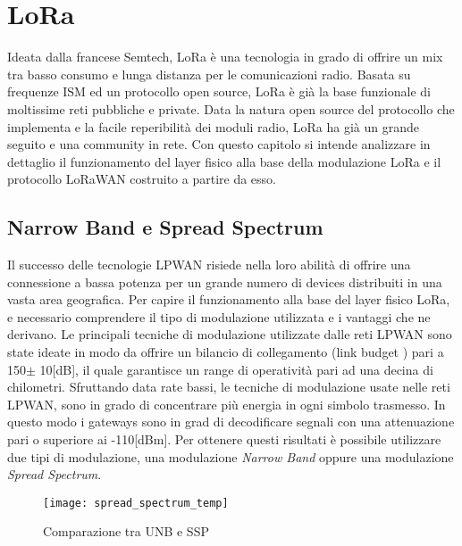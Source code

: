 \chapter{LoRa}
Ideata dalla francese Semtech, LoRa è una tecnologia in grado di offrire un mix
tra basso consumo e lunga distanza per le comunicazioni radio. Basata su
frequenze ISM ed un protocollo open source, LoRa è già la base funzionale di moltissime
reti pubbliche e private.
Data la natura open source del protocollo che implementa e la facile
reperibilità dei moduli radio, LoRa ha già un grande seguito e una community in
rete. Con questo capitolo si intende analizzare in dettaglio il funzionamento
del layer fisico alla base della modulazione LoRa e il protocollo LoRaWAN
costruito a partire da esso.

\section{Narrow Band e Spread Spectrum}
Il successo delle tecnologie LPWAN risiede nella loro abilità di offrire una
connessione a bassa potenza per un grande numero di devices distribuiti in una
vasta area geografica. Per capire il funzionamento alla base del layer fisico
LoRa, e necessario comprendere il tipo di modulazione utilizzata e i vantaggi
che ne derivano.  Le principali tecniche di modulazione utilizzate dalle reti
LPWAN sono state ideate in modo da offrire un bilancio di collegamento (link
budget ) pari a 150$\pm$ 10[dB], il quale garantisce un range di operatività
pari ad una decina di chilometri. Sfruttando  data rate bassi, le tecniche di
modulazione usate nelle reti LPWAN, sono in grado di  concentrare più energia in
ogni simbolo trasmesso. In questo modo i gateways sono in grad di decodificare
segnali con una attenuazione pari o superiore ai -110[dBm]. Per ottenere questi
risultati è possibile utilizzare due tipi di modulazione, una modulazione
\emph{Narrow Band} oppure una modulazione \emph{Spread Spectrum}.

\begin{figure}[h]
\centering 
\texttt{[image: spread\_spectrum\_temp]}
\caption{Comparazione tra UNB e SSP}
\end{figure}

